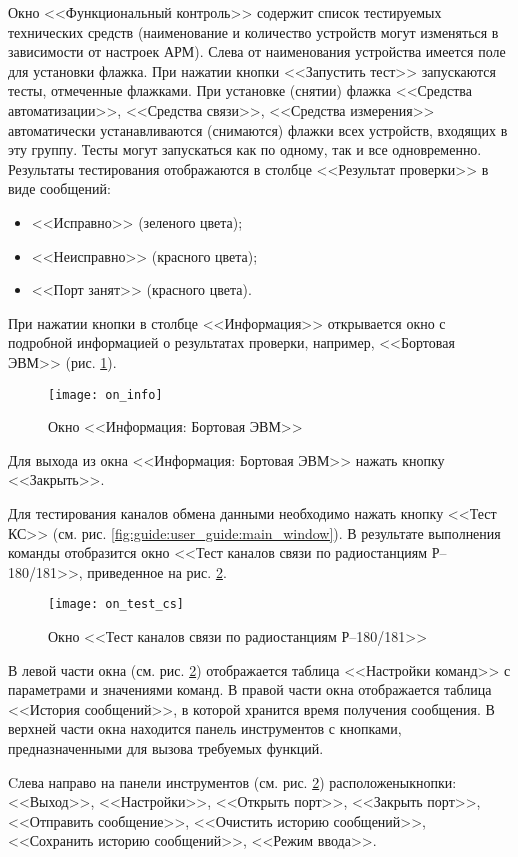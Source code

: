 Окно <<Функциональный контроль>> содержит список тестируемых технических средств
(наименование и количество устройств могут изменяться в зависимости от настроек АРМ).
Слева от наименования устройства имеется поле для установки флажка.
При нажатии кнопки <<Запустить тест>> запускаются тесты, отмеченные флажками.
При установке (снятии) флажка <<Средства автоматизации>>, <<Средства связи>>,
<<Средства измерения>> автоматически
устанавливаются (снимаются) флажки всех устройств, входящих в эту группу.
Тесты могут запускаться как по одному, так и все одновременно.
Результаты тестирования отображаются в столбце <<Результат проверки>> в виде сообщений:
\begin{itemize}
		\item <<Исправно>> (зеленого цвета);
		\item <<Неисправно>> (красного цвета);
		\item <<Порт занят>> (красного цвета).
\end{itemize}

При нажатии кнопки в столбце <<Информация>> открывается окно с подробной информацией о результатах проверки,
например, <<Бортовая ЭВМ>> (рис. \ref{fig:guide:user_guide:on_info}).
\begin{figure}[ht]
	\centering
	\texttt{[image: on\_info]}
	\caption{Окно <<Информация: Бортовая ЭВМ>>}
	\label{fig:guide:user_guide:on_info}
\end{figure}
Для выхода из окна <<Информация: Бортовая ЭВМ>> нажать кнопку <<Закрыть>>.

Для тестирования каналов обмена данными необходимо нажать кнопку <<Тест КС>> (см. рис.
\ref{fig:guide:user_guide:main_window}).
В результате выполнения команды отобразится окно <<Тест каналов связи по радиостанциям Р–180/181>>, приведенное на рис.
\ref{fig:guide:user_guide:on_test_cs}.
\begin{figure}[ht]
	\centering
	\texttt{[image: on\_test\_cs]}
	\caption{Окно <<Тест каналов связи по радиостанциям Р–180/181>>}
	\label{fig:guide:user_guide:on_test_cs}
\end{figure}
В левой части окна (см. рис. \ref{fig:guide:user_guide:on_test_cs}) отображается таблица <<Настройки команд>> с параметрами и значениями команд.
В правой части окна отображается таблица <<История сообщений>>, в которой хранится время получения сообщения.
В верхней части окна находится панель инструментов с кнопками, предназначенными для вызова требуемых функций.

Cлева направо на панели инструментов (см. рис. \ref{fig:guide:user_guide:on_test_cs}) расположены\break кнопки: <<Выход>>,
<<Настройки>>, <<Открыть порт>>, <<Закрыть порт>>,
<<Отправить сообщение>>, <<Очистить историю сообщений>>,
<<Сохранить историю сообщений>>, <<Режим ввода>>.

